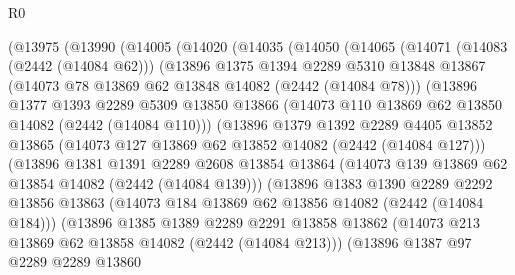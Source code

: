 \begin{lexlean}{R0}
\begin{coremodule}
        (@13975
          (@13990
            (@14005
              (@14020
                (@14035
                  (@14050
                    (@14065
                      (@14071
                        (@14083 (@2442 (@14084 @62)))
                        (@13896
                          @1375
                          @1394
                          @2289
                          @5310
                          @13848
                          @13867
                          (@14073 @78 @13869 @62 @13848 @14082 (@2442 (@14084 @78)))
                          (@13896
                            @1377
                            @1393
                            @2289
                            @5309
                            @13850
                            @13866
                            (@14073 @110 @13869 @62 @13850 @14082 (@2442 (@14084 @110)))
                            (@13896
                              @1379
                              @1392
                              @2289
                              @4405
                              @13852
                              @13865
                              (@14073 @127 @13869 @62 @13852 @14082 (@2442 (@14084 @127)))
                              (@13896
                                @1381
                                @1391
                                @2289
                                @2608
                                @13854
                                @13864
                                (@14073 @139 @13869 @62 @13854 @14082 (@2442 (@14084 @139)))
                                (@13896
                                  @1383
                                  @1390
                                  @2289
                                  @2292
                                  @13856
                                  @13863
                                  (@14073 @184 @13869 @62 @13856 @14082 (@2442 (@14084 @184)))
                                  (@13896
                                    @1385
                                    @1389
                                    @2289
                                    @2291
                                    @13858
                                    @13862
                                    (@14073 @213 @13869 @62 @13858 @14082 (@2442 (@14084 @213)))
                                    (@13896
                                      @1387
                                      @97
                                      @2289
                                      @2289
                                      @13860

\end{coremodule}
\end{lexlean}
